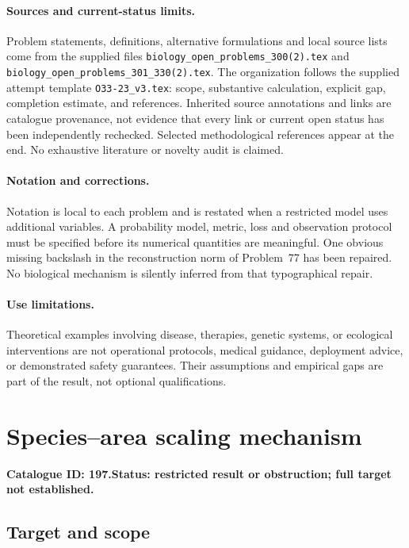 \documentclass[11pt]{article}
\begin{document}
\paragraph{Sources and current-status limits.}
Problem statements, definitions, alternative formulations and local source lists
come from the supplied files
\texttt{biology\_open\_problems\_300(2).tex} and
\texttt{biology\_open\_problems\_301\_330(2).tex}.
The organization follows the supplied attempt template
\texttt{O33-23\_v3.tex}: scope, substantive calculation, explicit gap,
completion estimate, and references. Inherited source annotations and links are
catalogue provenance, not evidence that every link or current open status has
been independently rechecked. Selected methodological references appear at the
end. No exhaustive literature or novelty audit is claimed.

\paragraph{Notation and corrections.}
Notation is local to each problem and is restated when a restricted model uses
additional variables. A probability model, metric, loss and observation protocol
must be specified before its numerical quantities are meaningful. One obvious
missing backslash in the reconstruction norm of Problem~77 has been repaired.
No biological mechanism is silently inferred from that typographical repair.

\paragraph{Use limitations.}
Theoretical examples involving disease, therapies, genetic systems, or ecological
interventions are not operational protocols, medical guidance, deployment advice,
or demonstrated safety guarantees. Their assumptions and empirical gaps are part
of the result, not optional qualifications.

\setcounter{section}{196}
\section{Species--area scaling mechanism}
\label{prob:197}
\noindent\textbf{Catalogue ID: 197.}\quad \textbf{Status: restricted result or obstruction; full target not established.}
\subsection{Target and scope}
\end{document}
